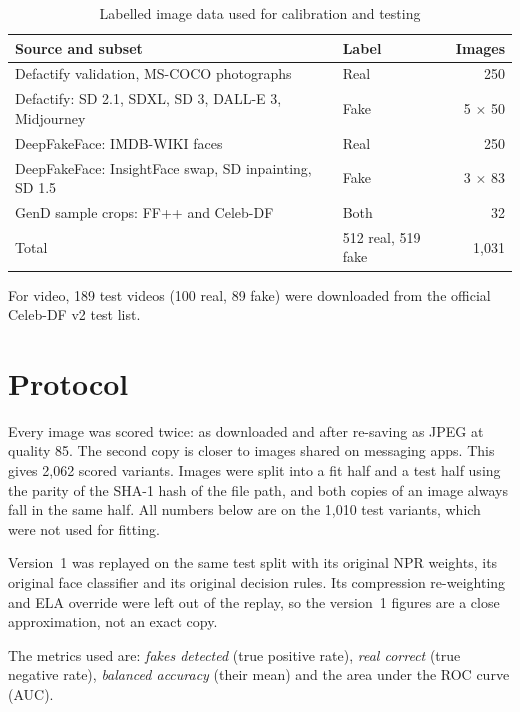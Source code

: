 \documentclass[12pt,a4paper,oneside]{report}
\begin{document}
\begin{table}[H]
\centering
\caption{Labelled image data used for calibration and testing}\label{tab:data}
\begin{tabularx}{\textwidth}{@{}Xlr@{}}
\toprule
Source and subset & Label & Images \\
\midrule
Defactify\cite{defactify} validation, MS-COCO photographs & Real & 250 \\
Defactify: SD 2.1, SDXL, SD 3, DALL-E 3, Midjourney & Fake & 5 $\times$ 50 \\
DeepFakeFace\cite{song2023}: IMDB-WIKI faces & Real & 250 \\
DeepFakeFace: InsightFace swap, SD inpainting, SD 1.5 & Fake & 3 $\times$ 83 \\
GenD sample crops: FF++\cite{rossler2019} and Celeb-DF\cite{li2020} & Both & 32 \\
\midrule
Total & 512 real, 519 fake & 1,031 \\
\bottomrule
\end{tabularx}
\end{table}

For video, 189 test videos (100 real, 89 fake) were downloaded from the official Celeb-DF v2 test list.

\section{Protocol}
Every image was scored twice: as downloaded and after re-saving as JPEG at quality 85. The second copy is closer to images shared on messaging apps. This gives 2,062 scored variants. Images were split into a fit half and a test half using the parity of the SHA-1 hash of the file path, and both copies of an image always fall in the same half. All numbers below are on the 1,010 test variants, which were not used for fitting.

Version~1 was replayed on the same test split with its original NPR weights, its original face classifier and its original decision rules. Its compression re-weighting and ELA override were left out of the replay, so the version~1 figures are a close approximation, not an exact copy.

The metrics used are: \emph{fakes detected} (true positive rate), \emph{real correct} (true negative rate), \emph{balanced accuracy} (their mean) and the area under the ROC curve (AUC).
\end{document}
